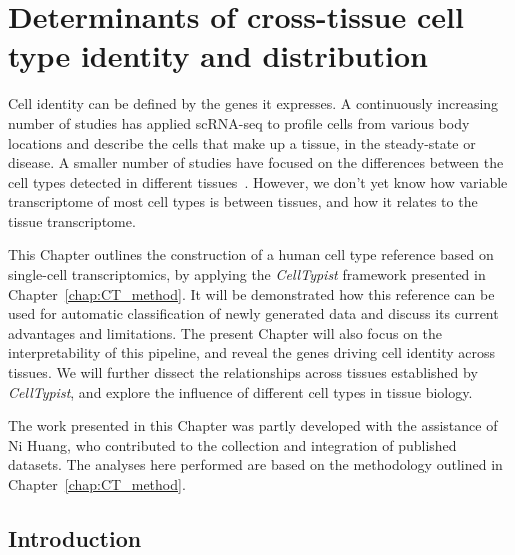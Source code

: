 \chapter{Determinants of cross-tissue cell type identity and distribution} \label{chap:CT_bio}

\ifpdf
    \graphicspath{{Chapter4/Figs/Raster/}{Chapter4/Figs/PDF/}{Chapter4/Figs/}}
\else
    \graphicspath{{Chapter4/Figs/Vector/}{Chapter4/Figs/}}
\fi
Cell identity can be defined by the genes it expresses. A continuously increasing number of studies has applied scRNA-seq to profile cells from various body locations and describe the cells that make up a tissue, in the steady-state or disease. A smaller number of studies have focused on the differences between the cell types detected in different tissues~\citep{miragaia_single-cell_2019,scott_transcription_2018}. However, we don't yet know how variable transcriptome of most cell types is between tissues, and how it relates to the tissue transcriptome.

This Chapter outlines the construction of a human cell type reference based on single-cell transcriptomics, by applying the \textit{CellTypist} framework presented in Chapter~\ref{chap:CT_method}. It will be demonstrated how this reference can be used for automatic classification of newly generated data and discuss its current advantages and limitations. The present Chapter will also focus on the interpretability of this pipeline, and reveal the genes driving cell identity across tissues. We will further dissect the relationships across tissues established by \textit{CellTypist}, and explore the influence of different cell types in tissue biology.

The work presented in this Chapter was partly developed with the assistance of Ni Huang, who contributed to the collection and integration of published datasets. The analyses here performed are based on the methodology outlined in Chapter~\ref{chap:CT_method}.


\section{Introduction}
\label{section4.1}




